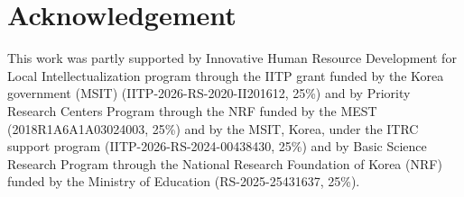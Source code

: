 \section*{Acknowledgement}

This work was partly supported by Innovative Human Resource Development for Local Intellectualization program through the IITP grant funded by the Korea government (MSIT) (IITP-2026-RS-2020-II201612, 25\%) and by Priority Research Centers Program through the NRF funded by the MEST (2018R1A6A1A03024003, 25\%) and by the MSIT, Korea, under the ITRC support program (IITP-2026-RS-2024-00438430, 25\%) and by Basic Science Research Program through the National Research Foundation of Korea (NRF) funded by the Ministry of Education (RS-2025-25431637, 25\%).
